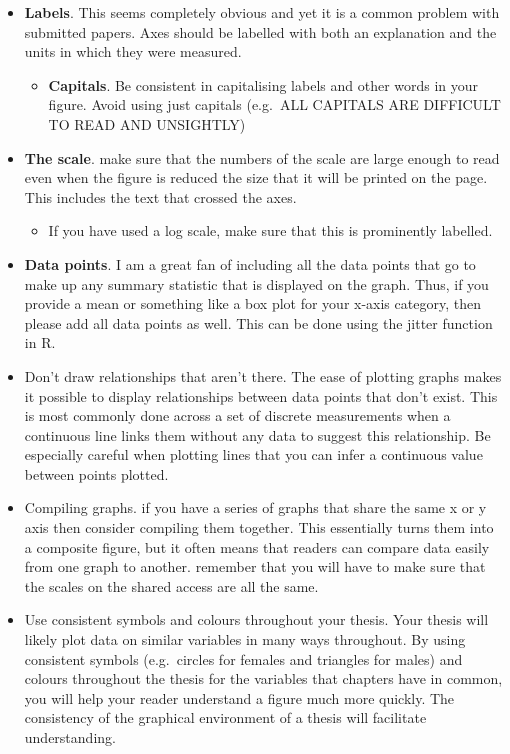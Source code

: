 \documentclass[
]{krantz}
\providecommand{\tightlist}{%
  \setlength{\itemsep}{0pt}\setlength{\parskip}{0pt}}
\begin{document}
\begin{itemize}
\tightlist
\item
  \textbf{Labels}. This seems completely obvious and yet it is a common problem with submitted papers. Axes should be labelled with both an explanation and the units in which they were measured.

  \begin{itemize}
  \tightlist
  \item
    \textbf{Capitals}. Be consistent in capitalising labels and other words in your figure. Avoid using just capitals (e.g.~ALL CAPITALS ARE DIFFICULT TO READ AND UNSIGHTLY)
  \end{itemize}
\item
  \textbf{The scale}. make sure that the numbers of the scale are large enough to read even when the figure is reduced the size that it will be printed on the page. This includes the text that crossed the axes.

  \begin{itemize}
  \tightlist
  \item
    If you have used a log scale, make sure that this is prominently labelled.
  \end{itemize}
\item
  \textbf{Data points}. I am a great fan of including all the data points that go to make up any summary statistic that is displayed on the graph. Thus, if you provide a mean or something like a box plot for your x-axis category, then please add all data points as well. This can be done using the jitter function in R.
\item
  Don't draw relationships that aren't there. The ease of plotting graphs makes it possible to display relationships between data points that don't exist. This is most commonly done across a set of discrete measurements when a continuous line links them without any data to suggest this relationship. Be especially careful when plotting lines that you can infer a continuous value between points plotted.
\item
  Compiling graphs. if you have a series of graphs that share the same x or y axis then consider compiling them together. This essentially turns them into a composite figure, but it often means that readers can compare data easily from one graph to another. remember that you will have to make sure that the scales on the shared access are all the same.
\item
  Use consistent symbols and colours throughout your thesis. Your thesis will likely plot data on similar variables in many ways throughout. By using consistent symbols (e.g.~circles for females and triangles for males) and colours throughout the thesis for the variables that chapters have in common, you will help your reader understand a figure much more quickly. The consistency of the graphical environment of a thesis will facilitate understanding.


\end{itemize}
\end{document}

